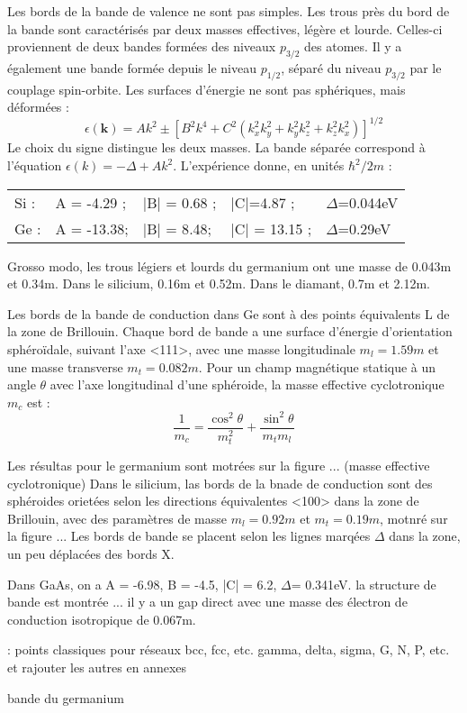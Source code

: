 Les bords de la bande de valence ne sont pas simples. Les trous près du bord de
la bande sont caractérisés par deux masses effectives, légère et lourde.
Celles-ci proviennent de deux bandes formées des niveaux $p_{3/2}$ des atomes. Il
y a également une bande formée depuis le niveau $p_{1/2}$, séparé du niveau
$p_{3/2}$ par le couplage spin-orbite. Les surfaces d'énergie ne sont pas
sphériques, mais déformées :
\begin{equation}
    \epsilon(\mathbf{k}) = Ak^2 \pm [B^2 k^4 + C^2(k_x^2k_y^2 + k_y^2k_z^2 +
    k_z^2k_x^2)]^{1/2}
\end{equation}
Le choix du signe distingue les deux masses. La bande séparée correspond à
l'équation $\epsilon(k) = -\Delta + Ak^2$. L'expérience donne, en unités
$\hbar^2/2m$ :

\begin{tabular}{lllll}
Si : & A = -4.29 ; & |B| = 0.68 ; & |C|=4.87 ; & $\Delta$=0.044eV \\
Ge : & A = -13.38; & |B| = 8.48; & |C| = 13.15 ; & $\Delta$=0.29eV
\end{tabular}

Grosso modo, les trous légiers et lourds du germanium ont une masse de 0.043m et
0.34m. Dans le silicium, 0.16m et 0.52m. Dans le diamant, 0.7m et 2.12m.

Les bords de la bande de conduction dans Ge sont à des points équivalents L de la
zone de Brillouin. Chaque bord de bande a une surface d'énergie d'orientation
sphéroïdale, suivant l'axe <111>, avec une masse longitudinale $m_l = 1.59m$ et
une masse transverse $m_t = 0.082m$. Pour un champ magnétique statique à un angle
$\theta$ avec l'axe longitudinal d'une sphéroide, la masse effective
cyclotronique $m_c$ est :
\begin{equation}
    \frac{1}{m_c} = \frac{\cos^2\theta}{m_t^2} + \frac{\sin^2 \theta}{m_t m_l}
\end{equation}

Les résultas pour le germanium sont motrées sur la figure ... (masse effective
cyclotronique)
Dans le silicium, las bords de la bnade de conduction sont des sphéroides
orietées selon les directions équivalentes <100> dans la zone de Brillouin, avec
des paramètres de masse $m_l = 0.92m$ et $m_t = 0.19m$, motnré sur la figure ...
Les bords de bande se placent selon les lignes marqées $\Delta$ dans la zone, un
peu déplacées des bords X.

Dans GaAs, on a A = -6.98, B = -4.5, |C| = 6.2, $\Delta$= 0.341eV. la structure
de bande est montrée ... il y a un gap direct avec une masse des électron de
conduction isotropique de 0.067m.

\TODO : points classiques pour réseaux bcc, fcc, etc. gamma, delta, sigma, G, N,
P, etc. et rajouter les autres en annexes



\begin{marginfigure}
\TODO
\caption{bande du germanium}
\label{bandeGe}
\end{marginfigure}
